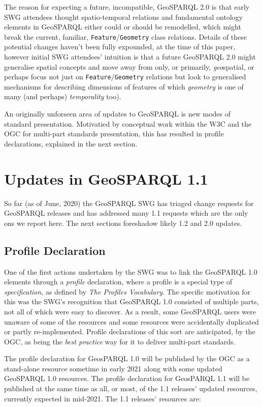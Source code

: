\documentclass[runningheads]{llncs}
\begin{document}
The reason for expecting a future, incompatible, GeoSPARQL 2.0 is that early SWG attendees thought spatio-temporal relations
and fundamental ontology elements in GeoSPARQL either could or should be remodelled, which might break the current, familiar, 
\texttt{Feature}/\texttt{Geometry} class relations. Details of these potential changes haven't been fully expounded, at the 
time of this paper, however initial SWG attendees' intuition is that a future GeoSPARQL 2.0 might generalise spatial concepts and
move away from only, or primarily, \textit{geo}spatial, or perhaps focus not just on \texttt{Feature}/\texttt{Geometry} relations
but look to generalised mechanisms for describing dimensions of features of which \textit{geometry} is one of many (and perhaps)
\textit{temporality} too).

An originally unforseen area of updates to GeoSPARQL is new modes of standard presentation. Motivatied by conceptual work within the W3C and the OGC for  
multi-part standards presentation, this has resulted in profile declarations, explained 
in the next section.


\section{Updates in GeoSPARQL 1.1}\label{sec:newfeatures}
So far (as of June, 2020) the GeoSPARQL SWG has triaged change requests for GeoSPARQL releases and has addressed
many 1.1 requests which are the only ons we report here. The next sections foreshadow likely 1.2 and 2.0 updates.

\subsection{Profile Declaration}\label{sec:profiledec}
One of the first actions undertaken by the SWG was to link the GeoSPARQL 1.0 elements through a \textit{profile} 
declaration, where a profile is a special type of \textit{specification}, as defined by \textit{The Profiles Vocabulary}\cite{atkinson_profiles_2020}. 
The specific motivation for this was the SWG's recognition that GeoSPARQL 1.0 consisted of multiple parts, not all
of which were easy to discover. As a result, some GeoSPARQL users were unaware of some of the resources and some
resources were accidentally duplicated or partly re-implemented. Profile declarations of this sort are anticipated, by the OGC, 
as being the \textit{best practice} way for it to deliver multi-part standards.

The profile declaration for GeosPARQL 1.0 will be published by the OGC as a stand-alone resource sometime in early 2021 along with some 
updated GeoSPARQL 1.0 resources. The profile declaration for GeosPARQL 1.1 will be published at the same time as all, or most, of the 
1.1 releases' updated resources, currently expected in mid-2021. The 1.1 releases' resources are:
\end{document}
